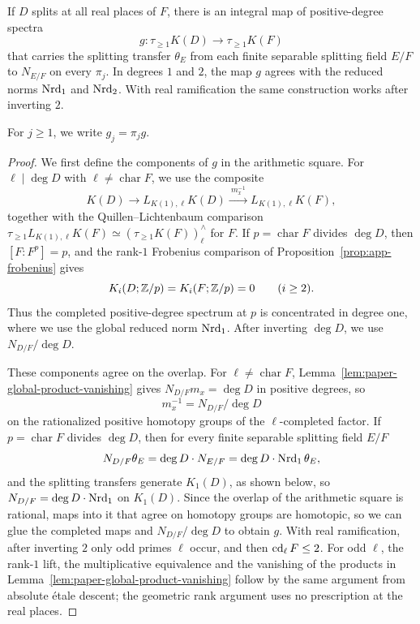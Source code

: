 \begin{theorem}\label{thm:paper-global-comparison}
If $D$ splits at all real places of $F$, there is an integral map of positive-degree spectra
\[
 g\colon\tau_{\ge1}K(D)\longrightarrow\tau_{\ge1}K(F)
\]
that carries the splitting transfer $\theta_E$ from each finite separable splitting field $E/F$ to $N_{E/F}$ on every $\pi_j$.
In degrees $1$ and $2$, the map $g$ agrees with the reduced norms $\operatorname{Nrd}_1$ and $\operatorname{Nrd}_2$.
With real ramification the same construction works after inverting $2$.
\end{theorem}

For $j\ge1$, we write $g_j=\pi_jg$.

\begin{proof}
We first define the components of $g$ in the arithmetic square.
For $\ell\mid\deg D$ with $\ell\ne\operatorname{char}F$, we use the composite
\[
 K(D)\longrightarrow L_{K(1),\ell}K(D)\xrightarrow{\ m_x^{-1}\ }L_{K(1),\ell}K(F),
\]
together with the Quillen--Lichtenbaum comparison $\tau_{\ge1}L_{K(1),\ell}K(F)\simeq(\tau_{\ge1}K(F))^\wedge_\ell$ for $F$.
If $p=\operatorname{char}F$ divides $\deg D$, then $[F:F^p]=p$, and the rank-$1$ Frobenius comparison of Proposition~\ref{prop:app-frobenius} gives
\[
 K_i(D;\mathbb Z/p)=K_i(F;\mathbb Z/p)=0\qquad(i\ge2).
\]
Thus the completed positive-degree spectrum at $p$ is concentrated in degree one, where we use the global reduced norm $\operatorname{Nrd}_1$.
After inverting $\deg D$, we use $N_{D/F}/\deg D$.

These components agree on the overlap.
For $\ell\ne\operatorname{char}F$, Lemma~\ref{lem:paper-global-product-vanishing} gives $N_{D/F}m_x=\deg D$ in positive degrees, so
\[
 m_x^{-1}=N_{D/F}/\deg D
\]
on the rationalized positive homotopy groups of the $\ell$-completed factor.
If $p=\operatorname{char}F$ divides $\deg D$, then for every finite separable splitting field $E/F$
\[
 N_{D/F}\theta_E=\deg D\cdot N_{E/F}=\deg D\cdot\operatorname{Nrd}_1\theta_E,
\]
and the splitting transfers generate $K_1(D)$, as shown below, so $N_{D/F}=\deg D\cdot\operatorname{Nrd}_1$ on $K_1(D)$.
Since the overlap of the arithmetic square is rational, maps into it that agree on homotopy groups are homotopic, so we can glue the completed maps and $N_{D/F}/\deg D$ to obtain $g$.
With real ramification, after inverting $2$ only odd primes $\ell$ occur, and then $\operatorname{cd}_\ell F\le2$.
For odd $\ell$, the rank-$1$ lift, the multiplicative equivalence and the vanishing of the products in Lemma~\ref{lem:paper-global-product-vanishing} follow by the same argument from absolute \'etale descent; the geometric rank argument uses no prescription at the real places.


\end{proof}
